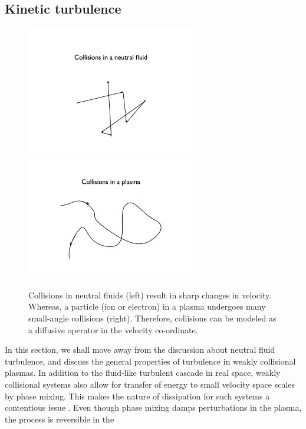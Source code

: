     \subsection{Kinetic turbulence}
    \label{intro:sec:turb:kinetic}

    \begin{figure}
    \begin{center}
        \includegraphics[width=7.4cm]{figs/intro/collisions_gas.png}
        \includegraphics[width=7.4cm]{figs/intro/collisions_plasma.png}
        \caption{Collisions in neutral fluids (left) result in sharp changes in velocity.
        Whereas, a particle (ion or electron) in a plasma undergoes many small-angle collisions
        (right). Therefore, collisions can be modeled as a diffusive operator in the
        velocity co-ordinate.}
        \label{intro:fig:collisions}
    \end{center}
    \end{figure}
    In this section, we shall move away from the discussion about neutral fluid turbulence, and discuss the
    general properties of turbulence in weakly collisional plasmas.
    In addition to the fluid-like turbulent cascade in real space, weakly collisional
    systems also allow for   
    transfer of energy to small velocity space scales by phase mixing. This makes the nature
    of dissipation for such systems a contentious issue \cite{parashar13}.
	Even though phase mixing damps
    perturbations in the plasma, the process is reversible in the
